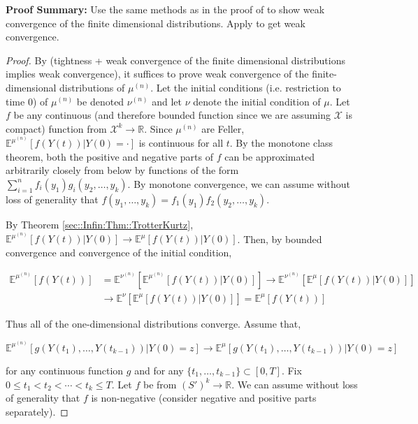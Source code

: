 \documentclass[12pt]{article}
\newcommand{\mb}{\mathbb}
\newcommand{\mc}{\mathcal}
\newcommand{\ra}{\rightarrow}
\newcommand{\pfsum}{\textbf{Proof Summary: }}
\newcommand{\ind}{\hspace{24pt}}
\newcommand{\exmu}[2]{\mb{E}^{#1}\left[#2\right]}	%
\renewcommand{\t}{t}							%
\newcommand{\tp}[1]{(#1)}						%
\newcommand{\sln}[1]{^{(#1)}}					%
\newcommand{\indx}[1]{_{#1}}					%
\newcommand{\m}{\mu}							%
\newcommand{\mm}{\nu}							%
\newcommand{\XX}{Y}								%
\renewcommand{\it}{k}							%
\newcommand{\spce}{\mc{X}}						%
\newcommand{\xx}{y}								%
\newcommand{\xxx}{z}							%
\begin{document}
\pfsum Use the same methods as in the proof of \cite[Theorem 4.2]{Kur81} to show weak convergence of the finite dimensional distributions. Apply \cite[Theorem 13.1]{Bil99} to get weak convergence.

\begin{proof}
By \cite[Theorem 13.1]{Bil99} (tightness + weak convergence of the finite dimensional distributions implies weak convergence), it suffices to prove weak convergence of the finite-dimensional distributions of \(\m\sln{n}\). Let the initial conditions (i.e. restriction to time 0) of \(\m\sln{n}\) be denoted \(\mm\sln{n}\) and let \(\mm\) denote the initial condition of \(\m\). Let \(f\) be any continuous (and therefore bounded function since we are assuming \(\spce\) is compact) function from \(\spce^k\ra\mb{R}\). Since \(\m\sln{n}\) are Feller, \(\exmu{\m\sln{n}}{f(\XX\tp{\t})|\XX\tp{0} = \cdot}\) is continuous for all \(\t\). By the monotone class theorem, both the positive and negative parts of \(f\) can be approximated arbitrarily closely from below by functions of the form \(\sum_{i=1}^n f\indx{i}(\xx\indx{1})g\indx{i}(\xx\indx{2},\dots,\xx\indx{\it})\). By monotone convergence, we can assume without loss of generality that \(f(\xx\indx{1},\dots,\xx\indx{\it}) = f\indx{1}(\xx\indx{1})f\indx{2}(\xx\indx{2},\dots,\xx\indx{\it})\).

\ind By Theorem \ref{sec::Infin:Thm::TrotterKurtz}, \(\exmu{\m\sln{n}}{f(\XX\tp{\t})|\XX\tp{0}} \ra \exmu{\m}{f(\XX\tp{\t})|\XX\tp{0}}\). Then, by bounded convergence and convergence of the initial condition,

\begin{align*}
\exmu{\m\sln{n}}{f(\XX\tp{\t})} & = \exmu{\mm\sln{n}}{\exmu{\m\sln{n}}{f(\XX\tp{\t})|\XX\tp{0}}} \ra \exmu{\mm\sln{n}}{\exmu{\m}{f(\XX\tp{\t})|\XX\tp{0}}}\\
& \ra \exmu{\mm}{\exmu{\m}{f(\XX\tp{\t})|\XX\tp{0}}} = \exmu{\m}{f(\XX\tp{\t})}
\end{align*}


Thus all of the one-dimensional distributions converge. Assume that,

\[\exmu{\m\sln{n}}{g(\XX\tp{\t\indx{1}},\dots,\XX\tp{\t\indx{k-1}})|\XX\tp{0}=\xxx} \ra \exmu{\m}{g(\XX\tp{\t\indx{1}},\dots,\XX\tp{\t\indx{k-1}})|\XX\tp{0}=\xxx}\]

\noindent for any continuous function \(g\) and for any \(\{\t\indx{1},\dots,\t\indx{k-1}\} \subset [0,T]\). Fix \(0\leq \t\indx{1} <\t\indx{2} <\cdots < \t\indx{\it}\leq T\). Let \(f\) be from \((S')^k \ra \mb{R}\). We can assume without loss of generality that \(f\) is non-negative (consider negative and positive parts separately).


\end{proof}
\end{document}
